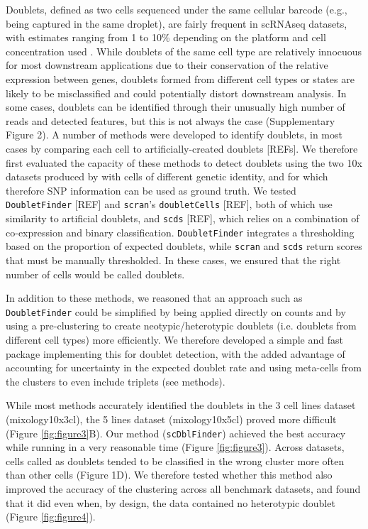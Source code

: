 \documentclass{bmcart}
\begin{document}
Doublets, defined as two cells sequenced under the same cellular barcode (e.g., being captured in the same droplet), are fairly frequent in scRNAseq datasets, with estimates ranging from 1 to 10\% depending on the platform and cell concentration used \citep{bloomEstimating2018,kangMultiplexedDemuxlet2018}. While doublets of the same cell type are relatively innocuous for most downstream applications due to their conservation of the relative expression between genes, doublets formed from different cell types or states are likely to be misclassified and could potentially distort downstream analysis. In some cases, doublets can be identified through their unusually high number of reads and detected features, but this is not always the case (Supplementary Figure 2). A number of methods were developed to identify doublets, in most cases by comparing each cell to artificially-created doublets [REFs]. We therefore first evaluated the capacity of these methods to detect doublets using the two 10x datasets produced by \citep{tianMixology2018} with cells of different genetic identity, and for which therefore SNP information can be used as ground truth. We tested \texttt{DoubletFinder} [REF] and \texttt{scran}'s \texttt{doubletCells} [REF], both of which use similarity to artificial doublets, and \texttt{scds} [REF], which relies on a combination of co-expression and binary classification. \texttt{DoubletFinder} integrates a thresholding based on the proportion of expected doublets, while \texttt{scran} and \texttt{scds} return scores that must be manually thresholded. In these cases, we ensured that the right number of cells would be called doublets.

In addition to these methods, we reasoned that an approach such as \texttt{DoubletFinder} could be simplified by being applied directly on counts and by using a pre-clustering to create neotypic/heterotypic doublets (i.e. doublets from different cell types) more efficiently. We therefore developed a simple and fast package implementing this for doublet detection, with the added advantage of accounting for uncertainty in the expected doublet rate and using meta-cells from the clusters to even include triplets (see methods).

While most methods accurately identified the doublets in the 3 cell lines dataset (mixology10x3cl), the 5 lines dataset (mixology10x5cl) proved more difficult (Figure \ref{fig:figure3}B). Our method (\texttt{scDblFinder}) achieved the best accuracy while running in a very reasonable time (Figure \ref{fig:figure3}). Across datasets, cells called as doublets tended to be classified in the wrong cluster more often than other cells (Figure 1D). We therefore tested whether this method also improved the accuracy of the clustering across all benchmark datasets, and found that it did even when, by design, the data contained no heterotypic doublet (Figure \ref{fig:figure4}).
\end{document}
